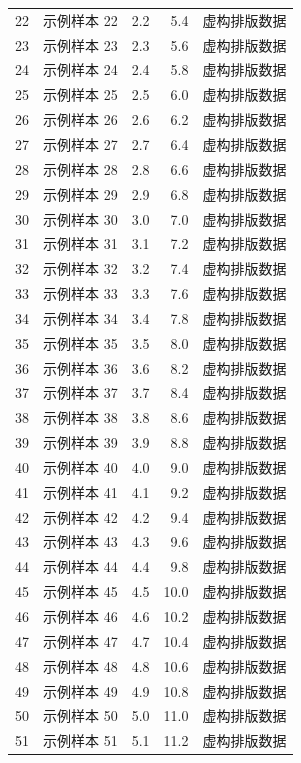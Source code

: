 \documentclass[bwprint]{gmcmthesis}
\numberwithin{figure}{section}
\numberwithin{table}{section}
\numberwithin{equation}{section}
\begin{document}
\begin{longtable}{@{}r p{.28\linewidth} r r p{.24\linewidth}@{}}
22 & 示例样本 22 & 2.2 & 5.4 & 虚构排版数据 \\
23 & 示例样本 23 & 2.3 & 5.6 & 虚构排版数据 \\
24 & 示例样本 24 & 2.4 & 5.8 & 虚构排版数据 \\
25 & 示例样本 25 & 2.5 & 6.0 & 虚构排版数据 \\
26 & 示例样本 26 & 2.6 & 6.2 & 虚构排版数据 \\
27 & 示例样本 27 & 2.7 & 6.4 & 虚构排版数据 \\
28 & 示例样本 28 & 2.8 & 6.6 & 虚构排版数据 \\
29 & 示例样本 29 & 2.9 & 6.8 & 虚构排版数据 \\
30 & 示例样本 30 & 3.0 & 7.0 & 虚构排版数据 \\
31 & 示例样本 31 & 3.1 & 7.2 & 虚构排版数据 \\
32 & 示例样本 32 & 3.2 & 7.4 & 虚构排版数据 \\
33 & 示例样本 33 & 3.3 & 7.6 & 虚构排版数据 \\
34 & 示例样本 34 & 3.4 & 7.8 & 虚构排版数据 \\
35 & 示例样本 35 & 3.5 & 8.0 & 虚构排版数据 \\
36 & 示例样本 36 & 3.6 & 8.2 & 虚构排版数据 \\
37 & 示例样本 37 & 3.7 & 8.4 & 虚构排版数据 \\
38 & 示例样本 38 & 3.8 & 8.6 & 虚构排版数据 \\
39 & 示例样本 39 & 3.9 & 8.8 & 虚构排版数据 \\
40 & 示例样本 40 & 4.0 & 9.0 & 虚构排版数据 \\
41 & 示例样本 41 & 4.1 & 9.2 & 虚构排版数据 \\
42 & 示例样本 42 & 4.2 & 9.4 & 虚构排版数据 \\
43 & 示例样本 43 & 4.3 & 9.6 & 虚构排版数据 \\
44 & 示例样本 44 & 4.4 & 9.8 & 虚构排版数据 \\
45 & 示例样本 45 & 4.5 & 10.0 & 虚构排版数据 \\
46 & 示例样本 46 & 4.6 & 10.2 & 虚构排版数据 \\
47 & 示例样本 47 & 4.7 & 10.4 & 虚构排版数据 \\
48 & 示例样本 48 & 4.8 & 10.6 & 虚构排版数据 \\
49 & 示例样本 49 & 4.9 & 10.8 & 虚构排版数据 \\
50 & 示例样本 50 & 5.0 & 11.0 & 虚构排版数据 \\
51 & 示例样本 51 & 5.1 & 11.2 & 虚构排版数据 \\

\end{longtable}
\end{document}
